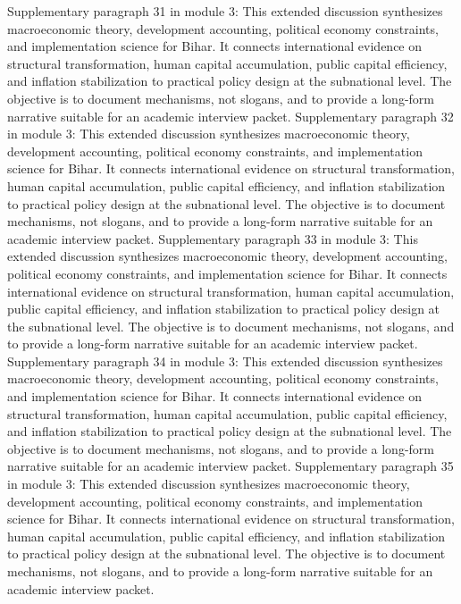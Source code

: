 \documentclass[preprint,12pt]{elsarticle}
\begin{document}
Supplementary paragraph 31 in module 3: This extended discussion synthesizes macroeconomic theory, development accounting, political economy constraints, and implementation science for Bihar. It connects international evidence on structural transformation, human capital accumulation, public capital efficiency, and inflation stabilization to practical policy design at the subnational level. The objective is to document mechanisms, not slogans, and to provide a long-form narrative suitable for an academic interview packet.
Supplementary paragraph 32 in module 3: This extended discussion synthesizes macroeconomic theory, development accounting, political economy constraints, and implementation science for Bihar. It connects international evidence on structural transformation, human capital accumulation, public capital efficiency, and inflation stabilization to practical policy design at the subnational level. The objective is to document mechanisms, not slogans, and to provide a long-form narrative suitable for an academic interview packet.
Supplementary paragraph 33 in module 3: This extended discussion synthesizes macroeconomic theory, development accounting, political economy constraints, and implementation science for Bihar. It connects international evidence on structural transformation, human capital accumulation, public capital efficiency, and inflation stabilization to practical policy design at the subnational level. The objective is to document mechanisms, not slogans, and to provide a long-form narrative suitable for an academic interview packet.
Supplementary paragraph 34 in module 3: This extended discussion synthesizes macroeconomic theory, development accounting, political economy constraints, and implementation science for Bihar. It connects international evidence on structural transformation, human capital accumulation, public capital efficiency, and inflation stabilization to practical policy design at the subnational level. The objective is to document mechanisms, not slogans, and to provide a long-form narrative suitable for an academic interview packet.
Supplementary paragraph 35 in module 3: This extended discussion synthesizes macroeconomic theory, development accounting, political economy constraints, and implementation science for Bihar. It connects international evidence on structural transformation, human capital accumulation, public capital efficiency, and inflation stabilization to practical policy design at the subnational level. The objective is to document mechanisms, not slogans, and to provide a long-form narrative suitable for an academic interview packet.
\end{document}
